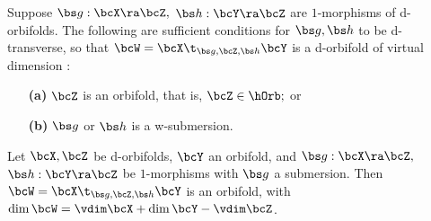 \documentclass{article}
\begin{document}
\begin{thm} Suppose\/ $\bs g:\bcX\ra\bcZ,$ $\bs h:\bcY\ra\bcZ$ are
$1$-morphisms of d-orbifolds. The following are sufficient
conditions for $\bs g,\bs h$ to be d-transverse, so that\/
$\bcW=\bcX\t_{\bs g,\bcZ,\bs h}\bcY$ is a d-orbifold of virtual
dimension\/ {\rm{}:}
\begin{itemize}
\setlength{\itemsep}{0pt}
\setlength{\parsep}{0pt}
\item[{\bf(a)}] $\bcZ$ is an orbifold, that is, $\bcZ\in\hOrb;$
or
\item[{\bf(b)}] $\bs g$ or $\bs h$ is a
w-submersion.
\end{itemize}
\label{ds11thm7}
\end{thm}

\begin{thm} Let\/ $\bcX,\bcZ$ be d-orbifolds, $\bcY$ an orbifold,
and\/ $\bs g:\bcX\ra\bcZ,$ $\bs h:\bcY\ra\bcZ$ be $1$-morphisms
with\/ $\bs g$ a submersion. Then\/ $\bcW=\bcX\t_{\bs g,\bcZ,\bs
h}\bcY$ is an orbifold,
with\/~$\dim\bcW=\vdim\bcX+\dim\bcY-
\vdim\bcZ$.
\label{ds11thm8}
\end{thm}
\end{document}

